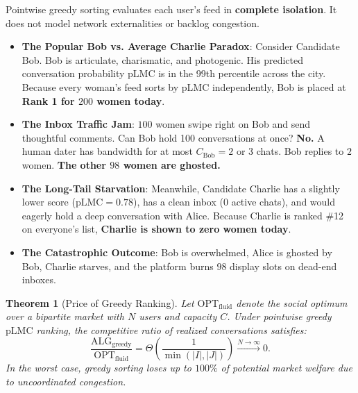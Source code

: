 \documentclass[11pt,letterpaper]{article}
\theoremstyle{definition}
\theoremstyle{plain}
\newtheorem{theorem}{Theorem}[section]
\theoremstyle{remark}
\begin{document}
\begin{warningbox}
Pointwise greedy sorting evaluates each user's feed in \textbf{complete isolation}. It does not model network externalities or backlog congestion.
\begin{itemize}[leftmargin=1.5em]
    \item \textbf{The Popular Bob vs. Average Charlie Paradox}:
    Consider Candidate Bob. Bob is articulate, charismatic, and photogenic. His predicted conversation probability $\mathrm{pLMC}$ is in the 99th percentile across the city.
    Because every woman's feed sorts by $\mathrm{pLMC}$ independently, Bob is placed at \textbf{Rank 1 for $200$ women today}.
    \item \textbf{The Inbox Traffic Jam}:
    $100$ women swipe right on Bob and send thoughtful comments. 
    Can Bob hold 100 conversations at once? \textbf{No.} A human dater has bandwidth for at most $C_{\text{Bob}} = 2$ or $3$ chats.
    Bob replies to $2$ women. \textbf{The other $98$ women are ghosted.}
    \item \textbf{The Long-Tail Starvation}:
    Meanwhile, Candidate Charlie has a slightly lower score ($\mathrm{pLMC} = 0.78$), has a clean inbox ($0$ active chats), and would eagerly hold a deep conversation with Alice.
    Because Charlie is ranked \#12 on everyone's list, \textbf{Charlie is shown to zero women today}.
    \item \textbf{The Catastrophic Outcome}:
    Bob is overwhelmed, Alice is ghosted by Bob, Charlie starves, and the platform burns $98$ display slots on dead-end inboxes.
\end{itemize}
\end{warningbox}

\begin{theorem}[Price of Greedy Ranking]
\label{thm:price_of_greed}
Let $\mathrm{OPT}_{\text{fluid}}$ denote the social optimum over a bipartite market with $N$ users and capacity $C$. Under pointwise greedy $\mathrm{pLMC}$ ranking, the competitive ratio of realized conversations satisfies:
\begin{equation}
    \frac{\mathrm{ALG}_{\text{greedy}}}{\mathrm{OPT}_{\text{fluid}}} = \Theta\left(\frac{1}{\min(|I|, |J|)}\right) \xrightarrow{N \to \infty} 0.
\end{equation}
In the worst case, greedy sorting loses up to $100\%$ of potential market welfare due to uncoordinated congestion.
\end{theorem}
\end{document}
